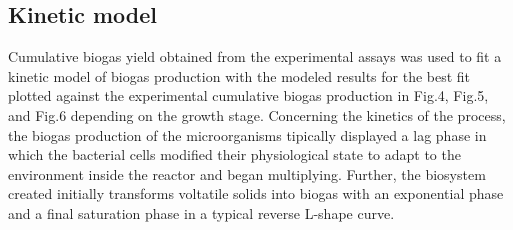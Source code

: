 \subsection{Kinetic model}
Cumulative biogas yield obtained from the experimental assays was used to fit a kinetic model of biogas production with the modeled results for the best fit plotted against the experimental cumulative biogas production in Fig.4, Fig.5, and Fig.6 depending on the growth stage.
Concerning the kinetics of the process, the biogas production of the microorganisms tipically displayed a lag phase in which the bacterial cells modified their physiological state to adapt to the environment inside the reactor and began multiplying. Further, the biosystem  created initially transforms voltatile solids into biogas with an exponential phase and a final saturation phase in a typical reverse L-shape curve.